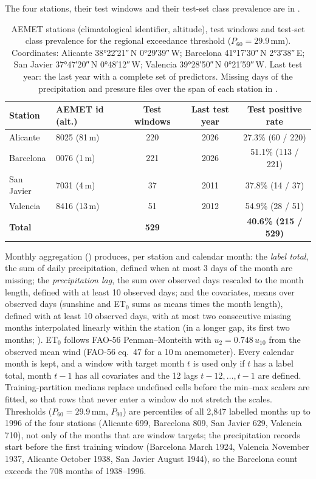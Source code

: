 \documentclass[11pt,a4paper]{article}
\begin{document}
The four stations, their test windows and their test-set class prevalence are in .

\begin{table}[htbp]
\centering
\caption{AEMET stations (climatological identifier, altitude), test windows and test-set class prevalence for the regional exceedance threshold ($P_{60}=29.9$\,mm). Coordinates: Alicante \ang{38;22;21}\,N \ang{0;29;39}\,W; Barcelona \ang{41;17;30}\,N \ang{2;3;38}\,E; San Javier \ang{37;47;20}\,N \ang{0;48;12}\,W; Valencia \ang{39;28;50}\,N \ang{0;21;59}\,W. Last test year: the last year with a complete set of predictors. Missing days of the precipitation and pressure files over the span of each station in .}
\label{tab:station_coverage}
{\small
\begin{tabular}{llccc}
\toprule
\textbf{Station} & \textbf{AEMET id (alt.)} & \textbf{Test windows} & \textbf{Last test year} & \textbf{Test positive rate} \\
\midrule
Alicante    & 8025 (81\,m) & 220 & 2026 & 27.3\% (60 / 220) \\
Barcelona   & 0076 (1\,m)  & 221 & 2026 & 51.1\% (113 / 221) \\
San Javier  & 7031 (4\,m)  & 37  & 2011 & 37.8\% (14 / 37) \\
Valencia    & 8416 (13\,m) & 51  & 2012 & 54.9\% (28 / 51) \\
\midrule
\textbf{Total} & & \textbf{529} & & \textbf{40.6\% (215 / 529)} \\
\bottomrule
\end{tabular}%
}
\end{table}

Monthly aggregation () produces, per station and calendar month: the \emph{label total}, the sum of daily precipitation, defined when at most 3 days of the month are missing; the \emph{precipitation lag}, the sum over observed days rescaled to the month length, defined with at least 10 observed days; and the covariates, means over observed days (sunshine and ET$_0$ sums as means times the month length), defined with at least 10 observed days, with at most two consecutive missing months interpolated linearly within the station (in a longer gap, its first two months; ). ET$_0$ follows FAO-56 Penman--Monteith with $u_2=0.748\,u_{10}$ from the observed mean wind (FAO-56 eq.~47 for a 10\,m anemometer). Every calendar month is kept, and a window with target month $t$ is used only if $t$ has a label total, month $t-1$ has all covariates and the 12 lags $t-12,\dots,t-1$ are defined. Training-partition medians replace undefined cells before the min--max scalers are fitted, so that rows that never enter a window do not stretch the scales. Thresholds ($P_{60}=29.9$\,mm, $P_{90}$) are percentiles of all 2{,}847 labelled months up to 1996 of the four stations (Alicante 699, Barcelona 809, San Javier 629, Valencia 710), not only of the months that are window targets; the precipitation records start before the first training window (Barcelona March 1924, Valencia November 1937, Alicante October 1938, San Javier August 1944), so the Barcelona count exceeds the 708 months of 1938--1996.
\end{document}

